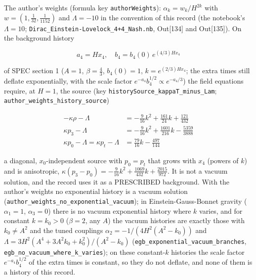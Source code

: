 \documentclass[11pt]{article}
\begin{document}
The author's weights (formula key \texttt{authorWe\allowbreak{}ights}): $\alpha_k = w_k/H^{2k}$ with $w = (1, \tfrac{1}{32}, \tfrac{1}{1152})$ and $\Lambda = -10$ in the convention of this record (the notebook's $\Lambda = 10$; \texttt{Dirac\_Ei\allowbreak{}nstein-L\allowbreak{}ovelock\_\allowbreak{}4+4\_Nash\allowbreak{}.nb}, Out[134] and Out[135]). On the background history

\[
a_4 = Hx_4,\quad b_4 = b_4(0)\,e^{(4/3)Hx_4}
\]

of SPEC section 1 ($A = 1$, $\beta = \tfrac43$, $b_4(0) = 1$, $k = e^{(2/3)Hx_4}$; the extra times still deflate exponentially, with the scale factor $e^{-a_4}b_4^{1/2} \propto e^{-a_4/3}$) the field equations require, at $H = 1$, the source (key \texttt{historyS\allowbreak{}ource\_ka\allowbreak{}ppaT\_min\allowbreak{}us\_Lam}; \texttt{author\_w\allowbreak{}eights\_h\allowbreak{}istory\_s\allowbreak{}ource})

\[
\begin{aligned}
-\kappa\rho - \Lambda &= -\tfrac{9}{16} k^{2} + \tfrac{161}{24} k + \tfrac{121}{432} \\
\kappa p_3 - \Lambda &= -\tfrac{9}{16} k^{2} + \tfrac{1601}{216} k - \tfrac{5359}{3888} \\
\kappa p_0 - \Lambda = \kappa p_t - \Lambda &= \tfrac{79}{16} k - \tfrac{497}{144}
\end{aligned}
\]

a diagonal, $x_0$-independent source with $p_0 = p_t$ that grows with $x_4$ (powers of $k$) and is anisotropic, $\kappa(p_3 - p_0) = -\tfrac{9}{16}k^2 + \tfrac{1069}{432}k + \tfrac{2015}{972}$. It is not a vacuum solution, and the record uses it as a PRESCRIBED background. With the author's weights no exponential history is a vacuum solution (\texttt{author\_w\allowbreak{}eights\_n\allowbreak{}o\_expone\allowbreak{}ntial\_va\allowbreak{}cuum}); in Einstein-Gauss-Bonnet gravity ($\alpha_1 = 1$, $\alpha_3 = 0$) there is no vacuum exponential history where $k$ varies, and for constant $k = k_0 > 0$ ($\beta = 2$, any $A$) the vacuum histories are exactly those with $k_0 \neq A^2$ and the tuned couplings $\alpha_2 = -1/(4H^2(A^2 - k_0))$ and $\Lambda = 3H^2(A^4 + 3A^2k_0 + k_0^2)/(A^2 - k_0)$ (\texttt{egb\_expo\allowbreak{}nential\_\allowbreak{}vacuum\_b\allowbreak{}ranches}, \texttt{egb\_no\_v\allowbreak{}acuum\_wh\allowbreak{}ere\_k\_va\allowbreak{}ries}); on these constant-$k$ histories the scale factor $e^{-a_4}b_4^{1/2}$ of the extra times is constant, so they do not deflate, and none of them is a history of this record.
\end{document}
